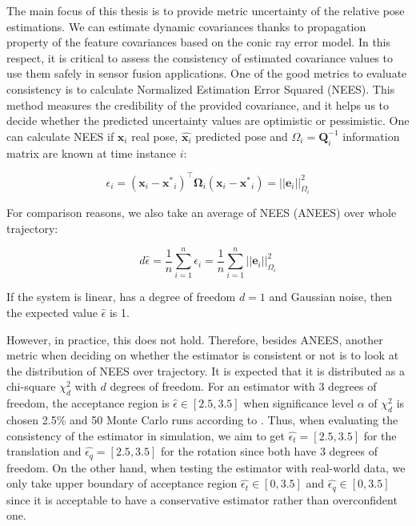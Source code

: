 \documentclass[a4paper]{report}
\numberwithin{figure}{section}
\begin{document}
The main focus of this thesis is to provide metric uncertainty of the relative pose estimations. We can estimate dynamic covariances thanks to propagation property of the feature covariances based on the conic ray error model. In this respect, it is critical to assess the consistency of estimated covariance values to use them safely in sensor fusion applications.  One of the good metrics to evaluate consistency is to calculate Normalized Estimation Error Squared (NEES). This method measures the credibility of the provided covariance, and it helps us to decide whether the predicted uncertainty values are optimistic or pessimistic.  One can calculate NEES if $\mathbf{x}_i$ real pose, $\hat{\mathbf{x}_i}$ predicted pose and $\Omega_i = \mathbf{Q}_i^{-1}$ information matrix are known at time instance $i$:

\begin{equation}
  \epsilon_i = (\mathbf{x}_i - \mathbf{x^*}_i)^\top \mathbf{\Omega}_i 
  (\mathbf{x}_i - \mathbf{x^*}_i) 
  = ||\mathbf{e}_i||^2_{\Omega_i}
\end{equation}


For comparison reasons, we also take an average of NEES (ANEES) over whole trajectory:

\begin{equation}
  d \hat{\epsilon} =  \frac{1}{n} \sum_{i=1}^{n} \epsilon_i = 
  \frac{1}{n} \sum_{i=1}^{n} ||\mathbf{e}_i||^2_{\Omega_i}
\end{equation}

If the system is linear, has a degree of freedom $d=1$ and Gaussian noise, 
then the expected value 
$\hat{\epsilon}$ is 1. 

However, in practice, this does not hold. Therefore, besides ANEES, another 
metric when deciding on whether the estimator is consistent or not is to look 
at the distribution of NEES over trajectory.  It is expected that it is 
distributed as a chi-square $\chi_d^2$ with $d$ degrees of freedom.  For an 
estimator with 3 degrees of freedom, the acceptance region is $\hat{\epsilon} 
\in 
[2.5,3.5]$ when significance level $\alpha$ of $\chi_d^2$ is chosen 2.5\% and 
50 Monte Carlo runs according to \parencite[see][234--235]{Shalom2001}.  Thus, 
when evaluating the consistency of the estimator in simulation, we aim to get 
$\hat{\epsilon_t}=[2.5,3.5]$ for the translation and 
$\hat{\epsilon_q}=[2.5,3.5]$ for the rotation since both have 3 degrees of 
freedom. On the other hand, when testing the estimator with real-world data, 
we only take upper boundary of acceptance region $\hat{\epsilon_t} \in [0, 
3.5]$ and $\hat{\epsilon_q} \in [0, 3.5]$ since it is acceptable to have a 
conservative estimator rather than overconfident one.
\end{document}
